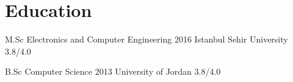 \section{Education}
\sectionStart
  
    
    \educationItem
    {M.Sc} 
    {Electronics and Computer Engineering} 
    {2016}
    {Istanbul Sehir University} 
    {3.8/4.0}
    
    \educationItem
    {B.Sc} 
    {Computer Science} 
    {2013}
    {University of Jordan} 
    {3.8/4.0}
\sectionEnd
